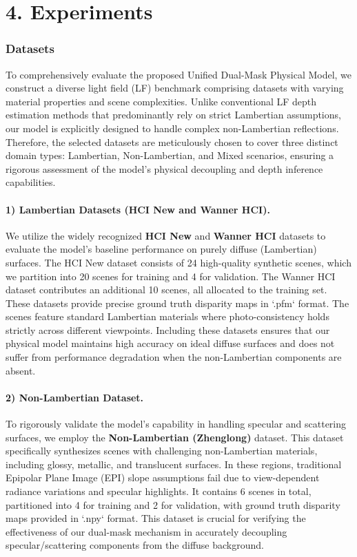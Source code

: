 \section{4. Experiments}

\subsubsection{Datasets}

To comprehensively evaluate the proposed Unified Dual-Mask Physical Model, we construct a diverse light field (LF) benchmark comprising datasets with varying material properties and scene complexities. Unlike conventional LF depth estimation methods that predominantly rely on strict Lambertian assumptions, our model is explicitly designed to handle complex non-Lambertian reflections. Therefore, the selected datasets are meticulously chosen to cover three distinct domain types: Lambertian, Non-Lambertian, and Mixed scenarios, ensuring a rigorous assessment of the model's physical decoupling and depth inference capabilities.

\paragraph{1) Lambertian Datasets (HCI New and Wanner HCI).}
We utilize the widely recognized \textbf{HCI New} and \textbf{Wanner HCI} datasets to evaluate the model's baseline performance on purely diffuse (Lambertian) surfaces. The HCI New dataset consists of 24 high-quality synthetic scenes, which we partition into 20 scenes for training and 4 for validation. The Wanner HCI dataset contributes an additional 10 scenes, all allocated to the training set. These datasets provide precise ground truth disparity maps in `.pfm` format. The scenes feature standard Lambertian materials where photo-consistency holds strictly across different viewpoints. Including these datasets ensures that our physical model maintains high accuracy on ideal diffuse surfaces and does not suffer from performance degradation when the non-Lambertian components are absent.

\paragraph{2) Non-Lambertian Dataset.}
To rigorously validate the model's capability in handling specular and scattering surfaces, we employ the \textbf{Non-Lambertian (Zhenglong)} dataset. This dataset specifically synthesizes scenes with challenging non-Lambertian materials, including glossy, metallic, and translucent surfaces. In these regions, traditional Epipolar Plane Image (EPI) slope assumptions fail due to view-dependent radiance variations and specular highlights. It contains 6 scenes in total, partitioned into 4 for training and 2 for validation, with ground truth disparity maps provided in `.npy` format. This dataset is crucial for verifying the effectiveness of our dual-mask mechanism in accurately decoupling specular/scattering components from the diffuse background.

